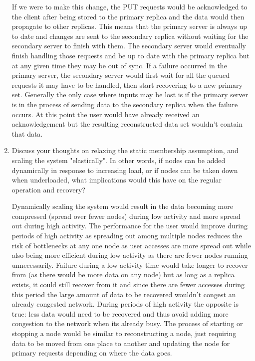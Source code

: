 \documentclass[11pt,twoside]{article}
\begin{document}
\begin{enumerate}
    If we were to make this change, the PUT requests would be acknowledged to the client after being stored to the primary replica and the data would then propagate to other replicas. This means that the primary server is always up to date and changes are sent to the secondary replica without waiting for the secondary server to finish with them. The secondary server would eventually finish handling those requests and be up to date with the primary replica but at any given time they may be out of sync. If a failure occurred in the primary server, the secondary server would first wait for all the queued requests it may have to be handled, then start recovering to a new primary set. Generally the only case where inputs may be lost is if the primary server is in the process of sending data to the secondary replica when the failure occurs. At this point the user would have already received an acknowledgement but the resulting reconstructed data set wouldn't contain that data. 
    
    
    \item Discuss your thoughts on relaxing the static membership assumption, and scaling the system "elastically". In other words, if nodes can be added dynamically in response to increasing load, or if nodes can be taken down when underloaded, what implications would this have on the regular operation and recovery?
    
    Dynamically scaling the system would result in the data becoming more compressed (spread over fewer nodes) during low activity and more spread out during high activity. The performance for the user would improve during periods of high activity as spreading out among multiple nodes reduces the risk of bottlenecks at any one node as user accesses are more spread out while also being more efficient during low activity as there are fewer nodes running unnecessarily. Failure during a low activity time would take longer to recover from (as there would be more data on any node) but as long as a replica exists, it could still recover from it and since there are fewer accesses during this period the large amount of data to be recovered wouldn't congest an already congested network. During periods of high activity the opposite is true: less data would need to be recovered and thus avoid adding more congestion to the network when its already busy. The process of starting or stopping a node would be similar to reconstructing a node, just requiring data to be moved from one place to another and updating the node for primary requests depending on where the data goes. 
\end{enumerate}
\end{document}
